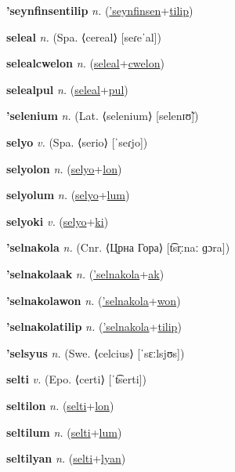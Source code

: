 \textbf{\hypertarget{'seynfinsentilip}{'seynfinsentilip}} \textit{n.} (\hyperlink{'seynfinsen}{'seynfinsen}+\allowbreak \hyperlink{tilip}{tilip})


\textbf{\hypertarget{seleal}{seleal}} \textit{n.} (Spa. ⟨cereal⟩ [seɾeˈal])


\textbf{\hypertarget{selealcwelon}{selealcwelon}} \textit{n.} (\hyperlink{seleal}{seleal}+\allowbreak \hyperlink{cwelon}{cwelon})


\textbf{\hypertarget{selealpul}{selealpul}} \textit{n.} (\hyperlink{seleal}{seleal}+\allowbreak \hyperlink{pul}{pul})


\textbf{\hypertarget{'selenium}{'selenium}} \textit{n.} (Lat. ⟨selenium⟩ [selenɪʊ̃])


\textbf{\hypertarget{selyo}{selyo}} \textit{v.} (Spa. ⟨serio⟩ [ˈseɾjo])


\textbf{\hypertarget{selyolon}{selyolon}} \textit{n.} (\hyperlink{selyo}{selyo}+\allowbreak \hyperlink{lon}{lon})


\textbf{\hypertarget{selyolum}{selyolum}} \textit{n.} (\hyperlink{selyo}{selyo}+\allowbreak \hyperlink{lum}{lum})


\textbf{\hypertarget{selyoki}{selyoki}} \textit{v.} (\hyperlink{selyo}{selyo}+\allowbreak \hyperlink{ki}{ki})


\textbf{\hypertarget{'selnakola}{'selnakola}} \textit{n.} (Cnr. ⟨Црна Гора⟩ [t͡sr̩ːnaː ɡɔra])


\textbf{\hypertarget{'selnakolaak}{'selnakolaak}} \textit{n.} (\hyperlink{'selnakola}{'selnakola}+\allowbreak \hyperlink{ak}{ak})


\textbf{\hypertarget{'selnakolawon}{'selnakolawon}} \textit{n.} (\hyperlink{'selnakola}{'selnakola}+\allowbreak \hyperlink{won}{won})


\textbf{\hypertarget{'selnakolatilip}{'selnakolatilip}} \textit{n.} (\hyperlink{'selnakola}{'selnakola}+\allowbreak \hyperlink{tilip}{tilip})


\textbf{\hypertarget{'selsyus}{'selsyus}} \textit{n.} (Swe. ⟨celcius⟩ [ˈsɛːlsjʊs])


\textbf{\hypertarget{selti}{selti}} \textit{v.} (Epo. ⟨certi⟩ [ˈt͡serti])


\textbf{\hypertarget{seltilon}{seltilon}} \textit{n.} (\hyperlink{selti}{selti}+\allowbreak \hyperlink{lon}{lon})


\textbf{\hypertarget{seltilum}{seltilum}} \textit{n.} (\hyperlink{selti}{selti}+\allowbreak \hyperlink{lum}{lum})


\textbf{\hypertarget{seltilyan}{seltilyan}} \textit{n.} (\hyperlink{selti}{selti}+\allowbreak \hyperlink{lyan}{lyan})


